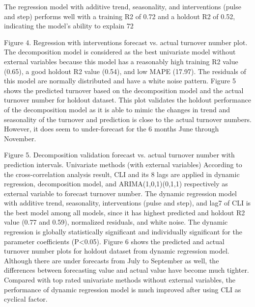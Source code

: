 The regression model with additive trend, seasonality, and interventions (pulse and step) performs well with a training  R2 of 0.72 and a holdout R2 of 0.52, indicating the model’s ability to explain 72%

Figure 4. Regression with interventions forecast vs. actual turnover number plot.
The decomposition model is considered as the best univariate model without external variables because this model has a reasonably high training R2 value (0.65), a good holdout R2 value (0.54), and low MAPE (17.97). The residuals of this model are normally distributed and have a white noise pattern. Figure 5 shows the predicted turnover based on the decomposition model and the actual turnover number for holdout dataset. This plot validates the holdout performance of the decomposition model as it is able to mimic the changes in trend and seasonality of the turnover and prediction is close to the actual turnover numbers. However, it does seem to under-forecast for the 6 months June through November.


Figure 5. Decomposition validation forecast vs. actual turnover number with prediction intervals.
Univariate methods (with external variables)
According to the cross-correlation analysis result, CLI and its 8 lags are applied in dynamic regression, decomposition model, and ARIMA(1,0,1)(0,1,1) respectively as external variable to forecast turnover number. The dynamic regression model with additive trend, seasonality, interventions (pulse and step), and lag7 of CLI is the best model among all models, since it has highest predicted and holdout R2 value (0.77 and 0.59), normalized residuals, and white noise. The dynamic regression is globally statistically significant and individually significant for the parameter coefficients (P<0.05). Figure 6 shows the predicted and actual turnover number plots for holdout dataset from dynamic regression model. Although there are under forecasts from July to September as well, the differences between forecasting value and actual value have become much tighter. Compared with top rated univariate methods without external variables, the performance of dynamic regression model is much improved after using CLI as cyclical factor. 

